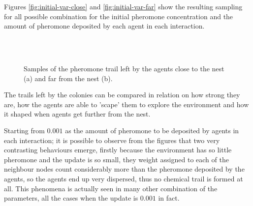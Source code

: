 Figures \ref{fig:initial-var-close} and \ref{fig:initial-var-far} show the resulting sampling for all possible combination for the initial pheromone concentration and the amount of pheromone deposited by each agent in each interaction.

\begin{figure}[H]
\myfloatalign
{} \\
 \\

\caption{Samples of the pheromone trail left by the agents close to the nest (a) and far from the nest (b). }\label{fig:initial-var-final}
\end{figure}


The trails left by the colonies can be compared in relation on how strong they are, how the agents are able to 'scape' them to explore the environment and how it shaped when agents get further from the nest.

Starting from $0.001$ as the amount of pheromone to be deposited by agents in each interaction; it is possible to observe from the figures that two very contrasting behaviours emerge, firstly because the environment has so little pheromone and the update is so small, they weight assigned to each of the neighbour nodes count considerably more than the pheromone deposited by the agents, so the agents end up very dispersed, thus no chemical trail is formed at all. This phenomena is actually seen in many other combination of the parameters, all the cases when the update is $0.001$ in fact. 

